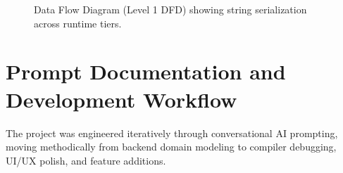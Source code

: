 \documentclass[12pt,a4paper,oneside]{book}
\begin{document}
\begin{figure}[htbp]
\caption{Data Flow Diagram (Level 1 DFD) showing string serialization across runtime tiers.}
\label{fig:dfd}
\end{figure}

\section{Prompt Documentation and Development Workflow}
The project was engineered iteratively through conversational AI prompting, moving methodically from backend domain modeling to compiler debugging, UI/UX polish, and feature additions.
\end{document}
